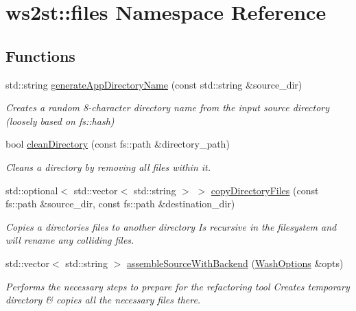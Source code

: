 \hypertarget{namespacews2st_1_1files}{}\section{ws2st\+:\+:files Namespace Reference}
\label{namespacews2st_1_1files}
\subsection*{Functions}
\begin{DoxyCompactItemize}
\item 
std\+::string \mbox{\hyperlink{namespacews2st_1_1files_ae8e7cbbd08d003dfce48a2e0a8a4c768}{generate\+App\+Directory\+Name}} (const std\+::string \&source\+\_\+dir)
\begin{DoxyCompactList}\small\item\em Creates a random 8-\/character directory name from the input source directory (loosely based on fs\+::hash) \end{DoxyCompactList}\item 
bool \mbox{\hyperlink{namespacews2st_1_1files_a0fed937b7498df1fb8980bc8150cc5b4}{clean\+Directory}} (const fs\+::path \&directory\+\_\+path)
\begin{DoxyCompactList}\small\item\em Cleans a directory by removing all files within it. \end{DoxyCompactList}\item 
std\+::optional$<$ std\+::vector$<$ std\+::string $>$ $>$ \mbox{\hyperlink{namespacews2st_1_1files_a64eab5e7433c2cf4f1dc38751b740b48}{copy\+Directory\+Files}} (const fs\+::path \&source\+\_\+dir, const fs\+::path \&destination\+\_\+dir)
\begin{DoxyCompactList}\small\item\em Copies a directories files to another directory Is recursive in the filesystem and will rename any colliding files. \end{DoxyCompactList}\item 
std\+::vector$<$ std\+::string $>$ \mbox{\hyperlink{namespacews2st_1_1files_a10984d26ef2edd156ea7c1a81359349a}{assemble\+Source\+With\+Backend}} (\mbox{\hyperlink{structWashOptions}{Wash\+Options}} \&opts)
\begin{DoxyCompactList}\small\item\em Performs the necessary steps to prepare for the refactoring tool Creates temporary directory \& copies all the necessary files there. \end{DoxyCompactList}\end{DoxyCompactItemize}


